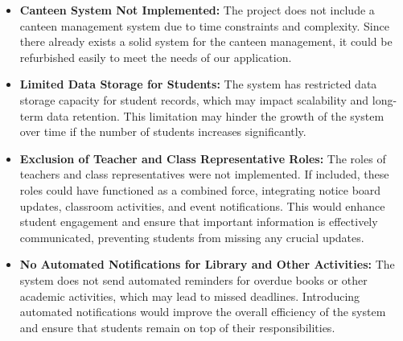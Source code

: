 \documentclass[a4paper,14pt]{article}
\begin{document}
{{{{{{{{{{{{{{{{		\newpage
		
		{
			\noindent \normalsize
			\justifying \begin{itemize}
				\item \textbf{Canteen System Not Implemented:} The project does not include a canteen management system due to time constraints and complexity. Since there already exists a solid system for the canteen management, it could be refurbished easily to meet the needs of our application.
				
				\item \textbf{Limited Data Storage for Students:} The system has restricted data storage capacity for student records, which may impact scalability and long-term data retention. This limitation may hinder the growth of the system over time if the number of students increases significantly.
				
				\item \textbf{Exclusion of Teacher and Class Representative Roles:} The roles of teachers and class representatives were not implemented. If included, these roles could have functioned as a combined force, integrating notice board updates, classroom activities, and event notifications. This would enhance student engagement and ensure that important information is effectively communicated, preventing students from missing any crucial updates.
				
				\item \textbf{No Automated Notifications for Library and Other Activities:} The system does not send automated reminders for overdue books or other academic activities, which may lead to missed deadlines. Introducing automated notifications would improve the overall efficiency of the system and ensure that students remain on top of their responsibilities.
			\end{itemize} 
		\vspace{0.5cm}
		
		\newpage
		
}}}}}}}}}}}}}}}}}
\end{document}
